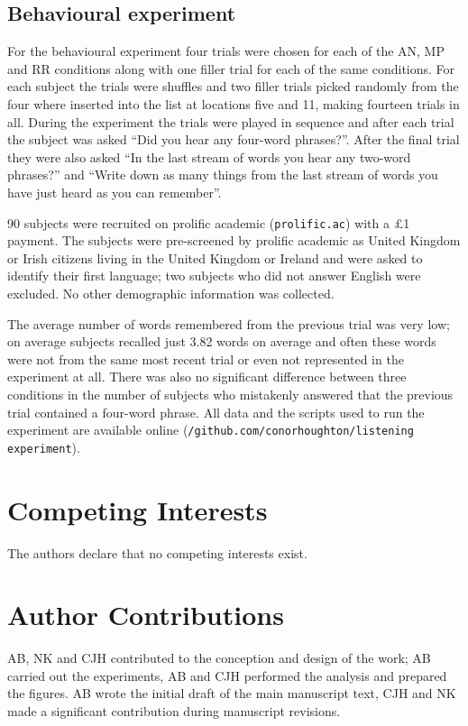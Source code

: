 \documentclass[10pt,letterpaper]{article}
\begin{document}
\subsection*{Behavioural experiment}

For the behavioural experiment four trials were chosen for each of the
AN, MP and RR conditions along with one filler trial for each of the
same conditions. For each subject the trials were shuffles and two
filler trials picked randomly from the four where inserted into the
list at locations five and 11, making fourteen trials in all. During
the experiment the trials were played in sequence and after each trial
the subject was asked ``Did you hear any four-word phrases?''. After
the final trial they were also asked ``In the last stream of words you
hear any two-word phrases?'' and ``Write down as many things from the
last stream of words you have just heard as you can remember''.

90 subjects were recruited on prolific academic (\texttt{prolific.ac})
with a £1 payment. The subjects were pre-screened by prolific academic
as United Kingdom or Irish citizens living in the United Kingdom or
Ireland and were asked to identify their first language; two subjects
who did not answer English were excluded. No other demographic
information was collected.

The average number of words remembered from the previous trial was
very low; on average subjects recalled just 3.82 words on average and
often these words were not from the same most recent trial or even not
represented in the experiment at all. There was also no significant
difference between three conditions in the number of subjects who
mistakenly answered that the previous trial contained a four-word
phrase. All data and the scripts used to run the experiment are
available online
(\texttt{/github.com/conorhoughton/listening\textunderscore
  experiment}).

\section*{Competing Interests}
The authors declare that no competing interests exist.



\section*{Author Contributions}
AB, NK and CJH contributed to the conception and design of the work;
AB carried out the experiments, AB and CJH performed the analysis and
prepared the figures. AB wrote the initial draft of the main
manuscript text, CJH and NK made a significant contribution during
manuscript revisions.
\end{document}
